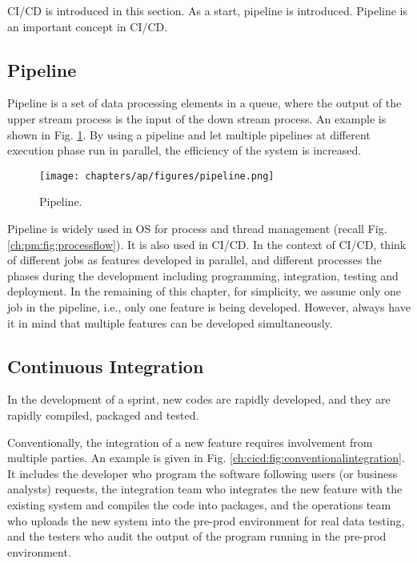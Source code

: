 CI/CD is introduced in this section. As a start, pipeline is introduced. Pipeline is an important concept in CI/CD.

\subsection{Pipeline}

Pipeline is a set of data processing elements in a queue, where the output of the upper stream process is the input of the down stream process. An example is shown in Fig. \ref{ch:cicd:fig:pipeline}. By using a pipeline and let multiple pipelines at different execution phase run in parallel, the efficiency of the system is increased.
\begin{figure}[htbp]
	\centering
	\texttt{[image: chapters/ap/figures/pipeline.png]}
	\caption{Pipeline.} \label{ch:cicd:fig:pipeline}
\end{figure}

Pipeline is widely used in OS for process and thread management (recall Fig. \ref{ch:pm:fig:processflow}). It is also used in CI/CD. In the context of CI/CD, think of different jobs as features developed in parallel, and different processes the phases during the development including programming, integration, testing and deployment. In the remaining of this chapter, for simplicity, we assume only one job in the pipeline, i.e., only one feature is being developed. However, always have it in mind that multiple features can be developed simultaneously.

\subsection{Continuous Integration}

In the development of a sprint, new codes are rapidly developed, and they are rapidly compiled, packaged and tested.

Conventionally, the integration of a new feature requires involvement from multiple parties. An example is given in Fig. \ref{ch:cicd:fig:conventionalintegration}. It includes the developer who program the software following users (or business analysts) requests, the integration team who integrates the new feature with the existing system and compiles the code into packages, and the operations team who uploads the new system into the pre-prod environment for real data testing, and the testers who audit the output of the program running in the pre-prod environment.


